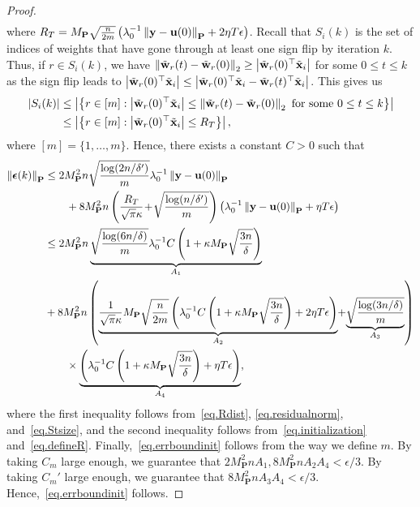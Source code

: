 \begin{proof}
\begin{equation}
\begin{aligned}
\end{aligned}
\end{equation}
where $R_T = M_{\mathbf{P}} \sqrt{\frac{n}{2m}} \left(\lambda_0^{-1}\left\lVert\mathbf{y} - \mathbf{u}(0)\right\rVert_{\mathbf{P}} + 2\eta T\epsilon\right)$. 
Recall that $S_i(k)$ is the set of indices of weights that have gone through at least one sign flip by iteration $k$. Thus, if $r \in S_i(k)$, we have $\left\lVert\tilde{\mathbf{w}}_r(t) - \tilde{\mathbf{w}}_r(0)\right\rVert_2 \geq \left|\tilde{\mathbf{w}}_r(0)^\top \tilde{\mathbf{x}}_i\right|$ for some $0 \leq t \leq k$ as the sign flip leads to $\left|\tilde{\mathbf{w}}_r(0)^\top \tilde{\mathbf{x}}_i\right| \leq \left|\tilde{\mathbf{w}}_r(0)^\top \tilde{\mathbf{x}}_i - \tilde{\mathbf{w}}_r(t)^\top \tilde{\mathbf{x}}_i \right|$. This gives us
\begin{equation}\label{eq.Stsize}
    \begin{aligned}
    \left|S_i(k)\right| &\leq \left|\left\{r \in [m] : \left|\tilde{\mathbf{w}}_r(0)^\top \tilde{\mathbf{x}}_i\right| \leq \left\lVert\tilde{\mathbf{w}}_r(t) - \tilde{\mathbf{w}}_r(0)\right\rVert_2 \text{ for some } 0\leq t\leq k\right\}\right| \\
    &\leq \left|\left\{r \in [m] : \left|\tilde{\mathbf{w}}_r(0)^\top \tilde{\mathbf{x}}_i\right| \leq R_T\right\}\right|,
\end{aligned}
\end{equation}
where $[m] = \{1,\ldots,m\}$. Hence, there exists a constant $C > 0$ such that
\begin{align*}
    \left\lVert\boldsymbol{\epsilon}(k)\right\rVert_{\mathbf{P}} &\leq 2M_{\mathbf{P}}^2n \sqrt{\frac{\log(2n/\delta')}{m}} \lambda_0^{-1} \left\lVert\mathbf{y} - \mathbf{u}(0)\right\rVert_{\mathbf{P}} \\
    &\qquad + 8M_{\mathbf{P}}^2 n \left(\frac{R_T}{\sqrt{\pi}\kappa} \!+\! \sqrt{\frac{\log(n/\delta')}{m}}\right) \left(\lambda_0^{-1}\left\lVert\mathbf{y} - \mathbf{u}(0)\right\rVert_{\mathbf{P}} + \eta T\epsilon\right) \\
    &\leq 2M_{\mathbf{P}}^2 n \underbrace{\sqrt{\frac{\log(6n/\delta)}{m}} \lambda_0^{-1} C\left(1+\kappa M_{\mathbf{P}}\sqrt{\frac{3n}{\delta}}\right)}_{A_1} \\
    &+ 8M_{\mathbf{P}}^2 n \left(\underbrace{\frac{1}{\sqrt{\pi}\kappa} M_{\mathbf{P}} \sqrt{\frac{n}{2m}} \left(\lambda_0^{-1} C\left(1+\kappa M_{\mathbf{P}}\sqrt{\frac{3n}{\delta}}\right) + 2\eta T\epsilon\right)}_{A_2} \!+\! \underbrace{\sqrt{\frac{\log(3n/\delta)}{m}}}_{A_3}\right) \\
    &\qquad \times\underbrace{\left(\lambda_0^{-1} C\left(1+\kappa M_{\mathbf{P}}\sqrt{\frac{3n}{\delta}}\right) + \eta T\epsilon\right)}_{A_4},
\end{align*}
where the first inequality follows from~\cref{eq.Rdist}, \cref{eq.residualnorm}, and~\cref{eq.Stsize}, and the second inequality follows from~\cref{eq.initialization} and~\cref{eq.defineR}. Finally,~\cref{eq.errboundinit} follows from the way we define $m$. By taking $C_m$ large enough, we guarantee that $2 M_{\mathbf{P}}^2 n A_1, 8M_{\mathbf{P}}^2 n A_2A_4 < \epsilon / 3$. By taking $C_m'$ large enough, we guarantee that $8 M_{\mathbf{P}}^2 n A_3A_4 < \epsilon / 3$. Hence,~\cref{eq.errboundinit} follows.
\end{proof}

